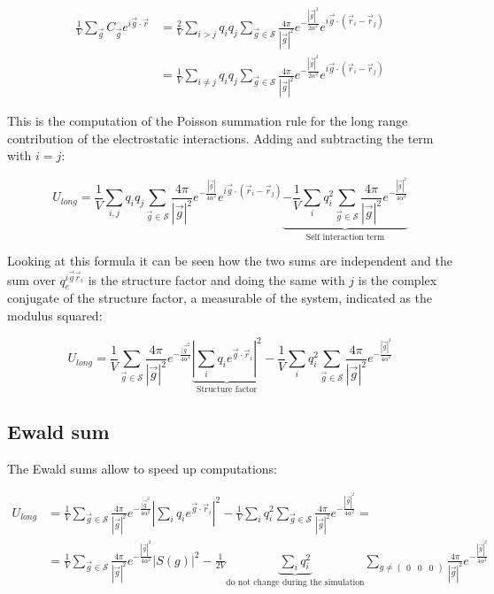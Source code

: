 	\begin{align*}
		\frac{1}{V}\sum\limits_{\vec{g}}C_{\vec{g}}e^{i\vec{g}\cdot\vec{r}} &= \frac{2}{V}\sum\limits_{i>j}q_iq_j\sum\limits_{\vec{g}\in\mathcal{S}}\frac{4\pi}{|\vec{g}|^2}e^{-\frac{|\vec{g}|^2}{2\alpha^2}}e^{i\vec{g}\cdot(\vec{r}_i-\vec{r}_j)}\\
																																				&=\frac{1}{V}\sum\limits_{i\neq j}q_iq_j\sum\limits_{\vec{g}\in\mathcal{S}}\frac{4\pi}{|\vec{g}|^2}e^{-\frac{|\vec{g}|^2}{2\alpha^2}}e^{i\vec{g}\cdot(\vec{r}_i-\vec{r}_j)}
	\end{align*}

	This is the computation of the Poisson summation rule for the long range contribution of the electrostatic interactions.
	Adding and subtracting the term with $i = j$:

	$$U_{long} = \frac{1}{V}\sum\limits_{i, j}q_iq_j\sum\limits_{\vec{g}\in\mathcal{S}}\frac{4\pi}{|\vec{g}|^2}e^{-\frac{|\vec{g}|}{4\alpha^2}}e^{i\vec{g}\cdot(\vec{r}_i-\vec{r}_j)}\underbrace{-\frac{1}{V}\sum\limits_iq_i^2\sum\limits_{\vec{g}\in\mathcal{S}}\frac{4\pi}{|\vec{g}|^2}e^{-\frac{|\vec{g}|^2}{4\alpha^2}}}_{\text{Self interaction term}}$$

	Looking at this formula it can be seen how the two sums are independent and the sum over $q_e^{i\vec{g}\vec{r}_i}$ is the structure factor and doing the same with $j$ is the complex conjugate of the structure factor, a measurable of the system, indicated as the modulus squared:

	$$U_{long} = \frac{1}{V}\sum\limits_{\vec{g}\in\mathcal{S}}\frac{4\pi}{|\vec{g}|^2}e^{-\frac{|\vec{g}^2}{4\alpha^2}}\underbrace{|\sum\limits_{i}q_ie^{\vec{g}\cdot\vec{r}_i}|^2}_{\text{Structure factor}} - \frac{1}{V}\sum\limits_iq_i^2\sum\limits_{\vec{g}\in\mathcal{S}}\frac{4\pi}{|\vec{g}|^2}e^{-\frac{|\vec{g}|^2}{4\alpha^2}}$$

	\subsection{Ewald sum}
	The Ewald sums allow to speed up computations:

	\begin{align*}
		U_{long} &= \frac{1}{V}\sum\limits_{\vec{g}\in\mathcal{S}}\frac{4\pi}{|\vec{g}|^2}e^{-\frac{|\vec{g}^2}{4\alpha^2}}|\sum\limits_{i}q_ie^{\vec{g}\cdot\vec{r}_i}|^2 - \frac{1}{V}\sum\limits_iq_i^2\sum\limits_{\vec{g}\in\mathcal{S}}\frac{4\pi}{|\vec{g}|^2}e^{-\frac{|\vec{g}|^2}{4\alpha^2}} = \\
						 &= \frac{1}{V}\sum\limits_{\vec{g}\in\mathcal{S}}\frac{4\pi}{|\vec{g}|^2}e^{-\frac{|\vec{g}|^2}{4\alpha^2}}|S(g)|^2-\frac{1}{2V}\underbrace{\sum\limits_{i}q_i^2}_{\text{do not change during the simulation}}\sum\limits_{g\neq\begin{pmatrix} 0&0&0\end{pmatrix}}\frac{4\pi}{|\vec{g}|^2}e^{-\frac{|\vec{g}|^2}{4\alpha^2}}
	\end{align*}

